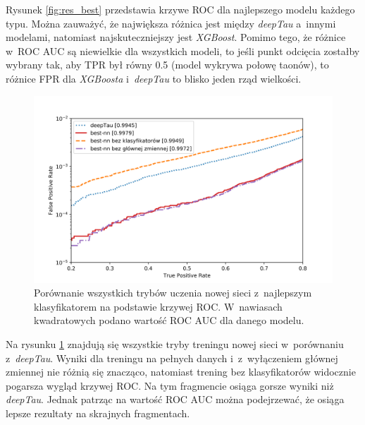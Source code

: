 \documentclass{pracalicmgr}
\begin{document}
	Rysunek \ref{fig:res_best} przedstawia krzywe ROC dla najlepszego modelu każdego typu. Można zauważyć, że największa różnica jest między \textit{deepTau} a~innymi modelami, natomiast najskuteczniejszy jest \textit{XGBoost}. Pomimo tego, że różnice w~ROC AUC są niewielkie dla wszystkich modeli, to jeśli punkt odcięcia zostałby wybrany tak, aby TPR był równy 0.5 (model wykrywa połowę taonów), to różnice FPR dla \textit{XGBoosta} i~\textit{deepTau} to blisko jeden rząd wielkości.
	
	\begin{figure}
	\centering
	\includegraphics[width=1\textwidth]{new_network.png}
	\caption{Porównanie wszystkich trybów uczenia nowej sieci z~najlepszym klasyfikatorem na podstawie krzywej ROC. W~nawiasach kwadratowych podano wartość ROC AUC dla danego modelu.}
	\label{fig:res_new}	
	\end{figure}
	
	Na rysunku \ref{fig:res_new} znajdują się wszystkie tryby treningu nowej sieci w~porównaniu z~\textit{deepTau}. Wyniki dla treningu na pełnych danych i~z~wyłączeniem głównej zmiennej nie różnią się znacząco, natomiast trening bez klasyfikatorów widocznie pogarsza wygląd krzywej ROC. Na tym fragmencie osiąga gorsze wyniki niż \textit{deepTau}. Jednak patrząc na wartość ROC AUC można podejrzewać, że osiąga lepsze rezultaty na skrajnych fragmentach.
	
\end{document}
